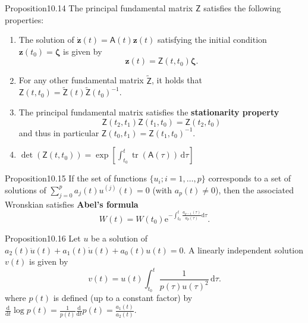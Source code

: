 \begin{res}{Proposition}{10.14}
The principal fundamental matrix $\mathsf Z$ satisfies the following properties:
\begin{enumerate}
\item The solution of $\dot{\boldsymbol z}(t)=\mathsf A(t)\boldsymbol z(t)$ satisfying the initial condition $\boldsymbol z(t_0)=\boldsymbol\zeta$ is given by
\begin{equation}\boldsymbol z(t)=\mathsf Z(t,t_0)\boldsymbol\zeta.\tag{10.62}\end{equation}
\item For any other fundamental matrix $\tilde{\mathsf Z}$, it holds that $\mathsf Z(t,t_0)=\tilde{\mathsf Z}(t)\tilde{\mathsf Z}(t_0)^{-1}$.
\item The principal fundamental matrix satisfies the \textbf{stationarity property}
\begin{equation}\mathsf Z(t_2,t_1)\mathsf Z(t_1,t_0)=\mathsf Z(t_2,t_0)\tag{10.63}\end{equation}
and thus in particular $\mathsf Z(t_0,t_1)=\mathsf Z(t_1,t_0)^{-1}$.
\item $\det(\mathsf Z(t,t_0))=\exp\left[\int_{t_0}^t\operatorname{tr}(\mathsf A(\tau))\,\mathrm d\tau\right]$
\end{enumerate}
\end{res}

\begin{res}{Proposition}{10.15}
If the set of functions $\{u_i;i=1,\dots,p\}$ corresponds to a set of solutions of $\sum_{j=0}^pa_j(t)u^{(j)}(t)=0$ (with $a_p(t)\ne0$), then the associated Wronskian satisfies \textbf{Abel's formula}
\begin{equation}W(t)=W(t_0)\mathrm e^{-\int_{t_0}^t\frac{a_{p-1}(\tau)}{a_p(\tau)}\mathrm d\tau}.\tag{10.67}\end{equation}
\end{res}

\begin{res}{Proposition}{10.16}
Let $u$ be a solution of $a_2(t)\ddot u(t)+a_1(t)\dot u(t)+a_0(t)u(t)=0$. A linearly independent solution $v(t)$ is given by
\begin{equation}v(t)=u(t)\int_{t_0}^t\frac1{p(\tau)u(\tau)^2}\,\mathrm d\tau.\tag{10.68}\end{equation}
where $p(t)$ is defined (up to a constant factor) by $\frac{\mathrm d}{\mathrm dt}\log p(t)=\frac1{p(t)}\frac{\mathrm d}{\mathrm dt}p(t)=\frac{a_1(t)}{a_2(t)}$.
\end{res}

